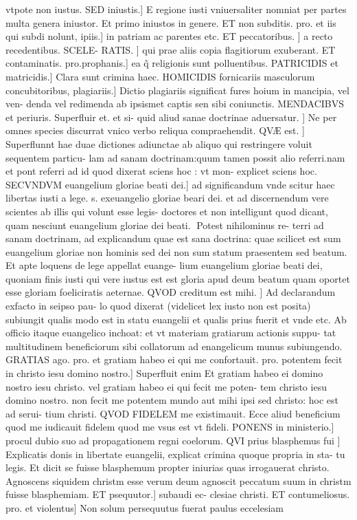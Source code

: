 \documentclass{article}
\begin{document}
\begin{pages}
vtpote non iustus. SED iniustis.] E regione iusti vniuersaliter nomniat per partes multa genera iniustor. Et primo iniustos in genere. ET non subditis. pro. et iis qui subdi nolunt, ipiis.] in patriam ac parentes etc. ET peccatoribus. ] a recto recedentibus. SCELE- RATIS. ] qui prae aliis copia flagitiorum exuberant. ET contaminatis. pro.prophanis.] ea q̃ religionis sunt polluentibus. PATRICIDIS et matricidis.] Clara sunt crimina haec. HOMICIDIS fornicariis  masculorum concubitoribus, plagiariis.] Dictio plagiariis significat fures hoium in mancipia, vel ven- denda vel redimenda ab ipsismet captis sen sibi coniunctis. MENDACIBVS et periuris. Superfluir et. et si- quid aliud sanae doctrinae aduersatur. ] Ne per omnes species discurrat vnico verbo reliqua compraehendit. QVÆ est. ] Superflunnt hae duae dictiones adiunctae ab aliquo qui restringere voluit sequentem particu- lam ad sanam doctrinam:quum tamen possit alio referri.nam et pont referri ad id quod dixerat sciens hoc : vt mon- explicet sciens hoc. SECVNDVM euangelium gloriae beati dei.] ad significandum vnde scitur haec libertas iusti a lege. s. exeuangelio gloriae beari dei. et ad discernendum vere scientes ab illis qui volunt esse legis- doctores et non intelligunt quod dicant, quam nesciunt euangelium gloriae dei beati. Potest nihilominus re- terri ad sanam doctrinam, ad explicandum quae est sana doctrina: quae scilicet est sum euangelium gloriae non hominis sed dei non sum statum praesentem sed beatum. Et apte loquens de lege appellat euange- lium euangelium gloriae beati dei, quoniam finis iusti qui vere iustus est est gloria apud deum beatum quam oportet esse gloriam foeliciratis aeternae. QVOD creditum est mihi. ] Ad declarandum exfacto in seipso pau- lo quod dixerat (videlicet lex iusto non est posita) subiungit qualis modo est in statu euangelii et qualis prius fuerit et vnde etc. Ab officio itaque euangelico inchoat: et vt materiam gratiarum actionis suppu- tat multitudinem beneficiorum sibi collatorum ad enangelicum munus subiungendo.  GRATIAS ago. pro. et gratiam habeo ei qui me confortauit. pro. potentem fecit in christo iesu domino nostro.] Superfluit enim Et gratiam habeo ei domino nostro iesu christo. vel gratiam habeo ei qui fecit me poten- tem christo iesu domino nostro. non fecit me potentem mundo aut mihi ipsi sed christo: hoc est ad serui- tium christi. QVOD FIDELEM me existimauit. Ecce aliud beneficium quod me iudicauit fidelem quod me vsus est vt fideli. PONENS in ministerio.] procul dubio suo ad propagationem regni coelorum. QVI prius blasphemus fui ] Explicatis donis in libertate euangelii, explicat crimina quoque propria in sta- tu legis. Et dicit se fuisse blasphemum propter iniurias quas irrogauerat christo. Agnoscens siquidem christm esse verum deum agnoscit peccatum suum in christm fuisse blasphemiam. ET psequutor.] subaudi ec- clesiae christi. ET contumeliosus. pro. et violentus] Non solum persequutus fuerat paulus eccelesiam  \pend

\end{pages}
\end{document}
